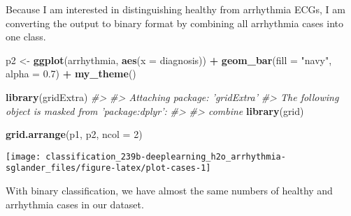\documentclass[]{book}
\newenvironment{Shaded}{\begin{snugshade}}{\end{snugshade}}
\newcommand{\CommentTok}[1]{\textcolor[rgb]{0.56,0.35,0.01}{\textit{#1}}}
\newcommand{\DataTypeTok}[1]{\textcolor[rgb]{0.13,0.29,0.53}{#1}}
\newcommand{\DecValTok}[1]{\textcolor[rgb]{0.00,0.00,0.81}{#1}}
\newcommand{\FloatTok}[1]{\textcolor[rgb]{0.00,0.00,0.81}{#1}}
\newcommand{\KeywordTok}[1]{\textcolor[rgb]{0.13,0.29,0.53}{\textbf{#1}}}
\newcommand{\NormalTok}[1]{#1}
\newcommand{\OperatorTok}[1]{\textcolor[rgb]{0.81,0.36,0.00}{\textbf{#1}}}
\newcommand{\StringTok}[1]{\textcolor[rgb]{0.31,0.60,0.02}{#1}}
\begin{document}
Because I am interested in distinguishing healthy from arrhythmia ECGs, I am converting the output to binary format by combining all arrhythmia cases into one class.

\begin{Shaded}
\end{Shaded}

\begin{Shaded}
\begin{Highlighting}[]
\NormalTok{p2 <-}\StringTok{ }\KeywordTok{ggplot}\NormalTok{(arrhythmia, }\KeywordTok{aes}\NormalTok{(}\DataTypeTok{x =}\NormalTok{ diagnosis)) }\OperatorTok{+}
\StringTok{  }\KeywordTok{geom_bar}\NormalTok{(}\DataTypeTok{fill =} \StringTok{"navy"}\NormalTok{, }\DataTypeTok{alpha =} \FloatTok{0.7}\NormalTok{) }\OperatorTok{+}
\StringTok{  }\KeywordTok{my_theme}\NormalTok{()}
\end{Highlighting}
\end{Shaded}

\begin{Shaded}
\begin{Highlighting}[]
\KeywordTok{library}\NormalTok{(gridExtra)}
\CommentTok{#> }
\CommentTok{#> Attaching package: 'gridExtra'}
\CommentTok{#> The following object is masked from 'package:dplyr':}
\CommentTok{#> }
\CommentTok{#>     combine}
\KeywordTok{library}\NormalTok{(grid)}

\KeywordTok{grid.arrange}\NormalTok{(p1, p2, }\DataTypeTok{ncol =} \DecValTok{2}\NormalTok{)}
\end{Highlighting}
\end{Shaded}

\begin{center}\texttt{[image: classification\_239b-deeplearning\_h2o\_arrhythmia-sglander\_files/figure-latex/plot-cases-1]} \end{center}

With binary classification, we have almost the same numbers of healthy and arrhythmia cases in our dataset.
\end{document}
